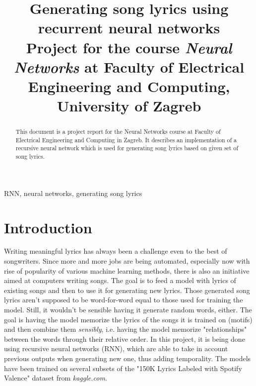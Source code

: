 \documentclass[conference]{IEEEtran}
\begin{document}
\title{Generating song lyrics using recurrent neural networks\\
{\footnotesize Project for the course \textit{Neural Networks} at Faculty of
Electrical Engineering and Computing, University of Zagreb}
}

\author{
\and
{}
\and
{}
\and
{}
\and
{}
\and
{}
}

\maketitle

\begin{abstract}
This document is a project report for the Neural Networks course at Faculty of
Electrical Engineering and Computing in Zagreb. It describes an implementation
of a recursive neural network which is used for generating song lyrics based
on given set of song lyrics.
\end{abstract}

\begin{IEEEkeywords}
RNN, neural networks, generating song lyrics
\end{IEEEkeywords}

\section{Introduction}
Writing meaningful lyrics has always been a challenge even to the best of songwriters.
Since more and more jobs are being automated, especially now with rise of popularity
of various machine learning methods, there is also an initiative aimed at
computers writing songs.
The goal is to feed a model with lyrics of existing songs and then to use it for
generating new lyrics. Those generated song lyrics aren't supposed to be
word-for-word equal to those used for training the model. Still, it wouldn't be
sensible having it generate random words, either. The goal is having the model 
memorize the lyrics of the songs it is trained on (motifs) and then combine them
\textit{sensibly}, i.e. having the model memorize "relationships" between the
words through their relative order.
In this project, it is being done using recursive neural networks (RNN), which
are able to take in account previous outputs when generating new one, thus
adding temporality. 
The models have been trained on several subsets of the "150K Lyrics Labeled with 
Spotify Valence" dataset from \textit{kaggle.com}.
\end{document}

